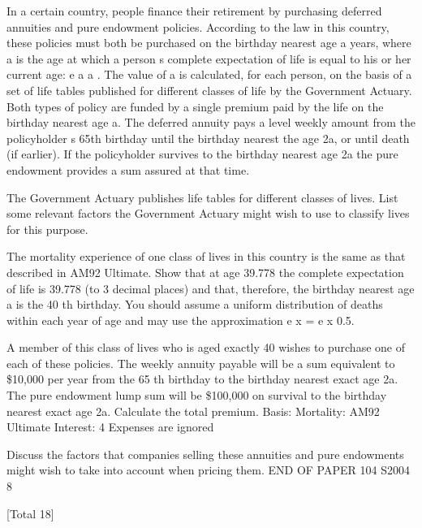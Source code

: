 \documentclass[a4paper,12pt]{article}
\begin{document}
In a certain country, people finance their retirement by purchasing deferred annuities
and pure endowment policies. According to the law in this country, these policies
must both be purchased on the birthday nearest age a years, where a is the age at
which a person s complete expectation of life is equal to his or her current age: e a a .
The value of a is calculated, for each person, on the basis of a set of life tables
published for different classes of life by the Government Actuary.
Both types of policy are funded by a single premium paid by the life on the birthday
nearest age a. The deferred annuity pays a level weekly amount from the
policyholder s 65th birthday until the birthday nearest the age 2a, or until death (if
earlier). If the policyholder survives to the birthday nearest age 2a the pure
endowment provides a sum assured at that time.
\item  The Government Actuary publishes life tables for different classes of lives.
List some relevant factors the Government Actuary might wish to use to
classify lives for this purpose.

\item  The mortality experience of one class of lives in this country is the same as
that described in AM92 Ultimate. Show that at age 39.778 the complete
expectation of life is 39.778 (to 3 decimal places) and that, therefore, the
birthday nearest age a is the 40 th birthday. You should assume a uniform
distribution of deaths within each year of age and may use the approximation
e x = e x 0.5.

\item  A member of this class of lives who is aged exactly 40 wishes to purchase one
of each of these policies. The weekly annuity payable will be a sum
equivalent to \$10,000 per year from the 65 th birthday to the birthday nearest
exact age 2a. The pure endowment lump sum will be \$100,000 on survival to
the birthday nearest exact age 2a. Calculate the total premium.
Basis: Mortality: AM92 Ultimate
Interest: 4%
Expenses are ignored

\item 
Discuss the factors that companies selling these annuities and pure
endowments might wish to take into account when pricing them.
END OF PAPER
104 S2004
8

[Total 18]
\end{document}
